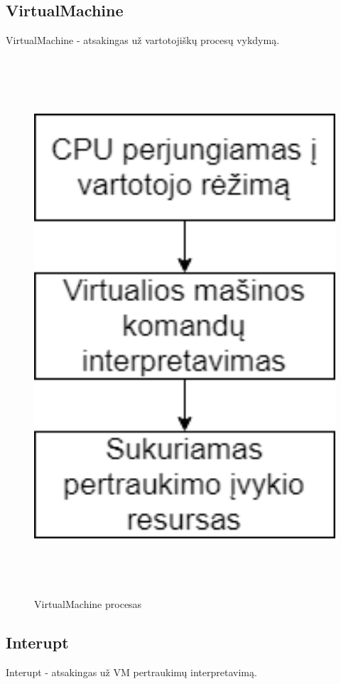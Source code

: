 \documentclass[oneside]{VUMIFPSkursinis}
\begin{document}
\subsection{VirtualMachine} VirtualMachine - atsakingas už vartotojiškų procesų vykdymą.
\begin{figure}[H]
		\centering	
	\includegraphics[width=18cm,height=20cm,keepaspectratio]{VirtualMachineProc.png}
	\caption{VirtualMachine procesas}
	\label{fig:VirtualMachine procesas}
\end{figure}

\subsection{Interupt}Interupt - atsakingas už VM pertraukimų interpretavimą.
\end{document}
